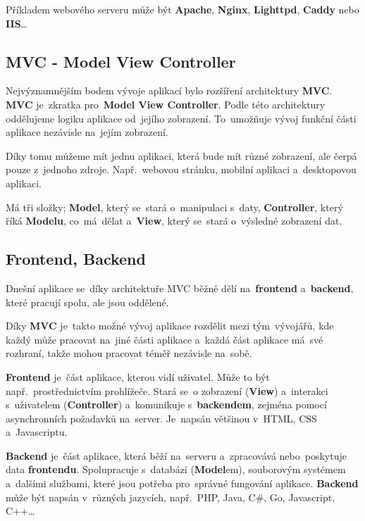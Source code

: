 \documentclass[14pt,a4paper]{article}
\begin{document}
        Příkladem webového serveru může být \textbf{Apache}, \textbf{Nginx}, \textbf{Lighttpd}, \textbf{Caddy} nebo \textbf{IIS}\dots

        
        \subsection{MVC - Model View Controller}
        Nejvýznamnějším bodem vývoje aplikací bylo rozšíření architektury \textbf{MVC}. \textbf{MVC} je~zkratka pro~\textbf{Model View Controller}. Podle této architektury oddělujeme logiku aplikace od~jejího zobrazení. To~umožňuje vývoj funkční části aplikace nezávisle na~jejím zobrazení.

        Díky tomu můžeme mít jednu aplikaci, která bude mít různé zobrazení, ale čerpá pouze z~jednoho zdroje. Např.~webovou stránku, mobilní aplikaci a~desktopovou aplikaci.

        Má tři složky; \textbf{Model}, který se~stará o~manipulaci s~daty, \textbf{Controller}, který říká \textbf{Modelu}, co~má~dělat a~\textbf{View}, který se~stará o~výsledné zobrazení dat. \parencite{MVC}

        \subsection{Frontend, Backend}
        Dnešní aplikace se~díky architektuře \textsc{MVC} běžně dělí na~\textbf{frontend} a~\textbf{backend}, které pracují spolu, ale jsou oddělené.

        Díky \textbf{MVC} je~takto možné vývoj aplikace rozdělit mezi tým~vývojářů, kde každý může pracovat na~jiné části aplikace a~každá část aplikace má~své rozhraní, takže mohou pracovat téměř nezávisle na~sobě.

        \textbf{Frontend} je~část aplikace, kterou vidí uživatel. Může to být např.~prostřednictvím prohlížeče. Stará se~o zobrazení (\textbf{View}) a~interakci s~uživatelem (\textbf{Controller}) a~komunikuje s~\textbf{backendem}, zejména pomocí asynchronních požadavků na~server. Je~napsán většinou v~HTML, CSS a~Javascriptu.

        \textbf{Backend} je~část aplikace, která běží na~serveru a~zpracovává nebo~poskytuje data \textbf{frontendu}. Spolupracuje s~databází (\textbf{Model}em), souborovým systémem a~dalšími službami, které jsou potřeba pro~správné fungování aplikace. \textbf{Backend} může být napsán v~různých jazycích, např.~PHP, Java, C\#, Go, Javascript, C++\dots
\end{document}
